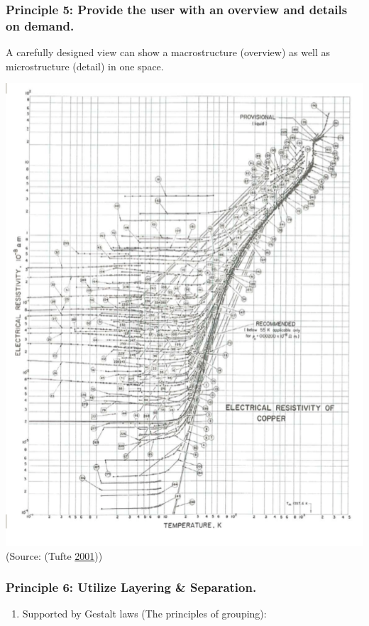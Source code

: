 \documentclass[]{book}
\providecommand{\tightlist}{%
  \setlength{\itemsep}{0pt}\setlength{\parskip}{0pt}}
\begin{document}
\subsubsection{Principle 5: Provide the user with an overview and
details on
demand.}\label{principle-5-provide-the-user-with-an-overview-and-details-on-demand.}

A carefully designed view can show a macrostructure (overview) as well
as microstructure (detail) in one space.

\includegraphics{images/Tufte_figure9.png} (Source: (Tufte
\protect\hyperlink{ref-Tufte_2001}{2001}))

\subsubsection{Principle 6: Utilize Layering \&
Separation.}\label{principle-6-utilize-layering-separation.}

\begin{enumerate}
\def\labelenumi{\arabic{enumi}.}
\tightlist
\item
  Supported by Gestalt laws (The principles of grouping):
\end{enumerate}
\end{document}
